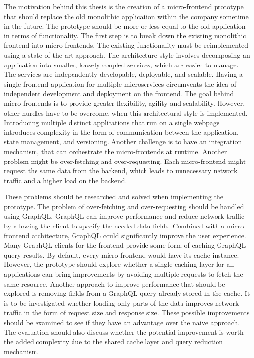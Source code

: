 The motivation behind this thesis is the creation of a micro-frontend prototype that should replace the old monolithic application within the company sometime in the future. The prototype should be more or less equal to the old application in terms of functionality. The first step is to break down the existing monolithic frontend into micro-frontends. The existing functionality must be reimplemented using a state-of-the-art approach. The architecture style involves decomposing an application into smaller, loosely coupled services, which are easier to manage. The services are independently developable, deployable, and scalable. Having a single frontend application for multiple microservices circumvents the idea of independent development and deployment on the frontend. The goal behind micro-frontends is to provide greater flexibility, agility and scalability. However, other hurdles have to be overcome, when this architectural style is implemented. Introducing multiple distinct applications that run on a single webpage introduces complexity in the form of communication between the application, state management, and versioning. Another challenge is to have an integration mechanism, that can orchestrate the micro-frontends at runtime. Another problem might be over-fetching and over-requesting. Each micro-frontend might request the same data from the backend, which leads to unnecessary network traffic and a higher load on the backend.

\bigskip

\noindent These problems should be researched and solved when implementing the prototype. The problem of over-fetching and over-requesting should be handled using GraphQL. GraphQL can improve performance and reduce network traffic by allowing the client to specify the needed data fields. Combined with a micro-frontend architecture, GraphQL could significantly improve the user experience. Many GraphQL clients for the frontend provide some form of caching GraphQL query results. By default, every micro-frontend would have its cache instance. However, the prototype should explore whether a single caching layer for all applications can bring improvements by avoiding multiple requests to fetch the same resource. Another approach to improve performance that should be explored is removing fields from a GraphQL query already stored in the cache. It is to be investigated whether loading only parts of the data improves network traffic in the form of request size and response size. These possible improvements should be examined to see if they have an advantage over the naive approach. The evaluation should also discuss whether the potential improvement is worth the added complexity due to the shared cache layer and query reduction mechanism.

